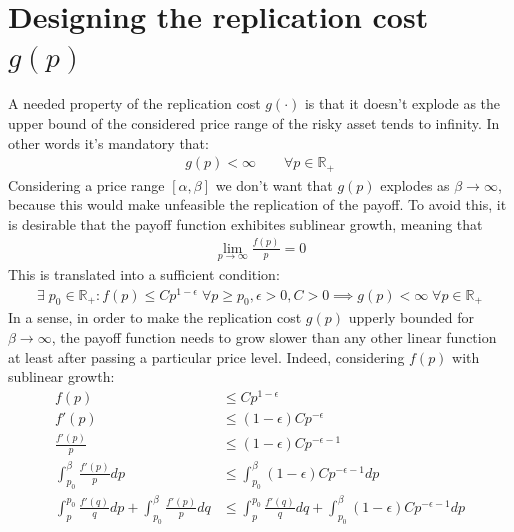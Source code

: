 \documentclass[12pt]{article}
\begin{document}
\section{Designing the replication cost $g(p)$}
A needed property of the replication cost $g(\cdot)$ is that it doesn't explode as the upper bound of the considered price range of the risky asset tends to infinity. In other words it's mandatory that:
\begin{align*}
    g(p)<\infty \qquad \forall p \in \mathbb{R_+}
\end{align*}
Considering a price range $[\alpha,\beta]$ we don't want that $g(p)$ explodes as $\beta\rightarrow\infty$, because this would make unfeasible the replication of the payoff. \newline
To avoid this, it is desirable that the payoff function exhibites sublinear growth, meaning that
\begin{align*}
    \lim_{p\rightarrow\infty} \frac{f(p)}{p} = 0
\end{align*}
This is translated into a sufficient condition:
\begin{align*}
    \exists\; p_{0} \in \mathbb{R_+}: f(p)\leq Cp^{1-\epsilon} \; \forall p \geq p_{0}, \epsilon>0, C>0 \implies g(p)<\infty \; \forall p \in \mathbb{R_+}
\end{align*}
In a sense, in order to make the replication cost $g(p)$ upperly bounded for $\beta\rightarrow\infty$, the payoff function needs to grow slower than any other linear function at least after passing a particular price level. \newline
Indeed, considering $f(p)$ with sublinear growth:
\begin{align*}
    f(p)                                                                    & \leq Cp^{1-\epsilon}                                                                    \\
    f'(p)                                                                   & \leq (1-\epsilon)Cp^{-\epsilon}                                                         \\
    \frac{f'(p)}{p}                                                         & \leq (1-\epsilon)Cp^{-\epsilon-1}                                                       \\
    \int_{p_0}^{\beta}\frac{f'(p)}{p} dp                                    & \leq \int_{p_0}^{\beta}(1-\epsilon)Cp^{-\epsilon-1}dp                                   \\
    \int_{p}^{p_0}\frac{f'(q)}{q} dp + \int_{p_0}^{\beta}\frac{f'(p)}{p} dq & \leq \int_{p}^{p_0}\frac{f'(q)}{q} dq +\int_{p_0}^{\beta}(1-\epsilon)Cp^{-\epsilon-1}dp \\
\end{align*}
\end{document}
